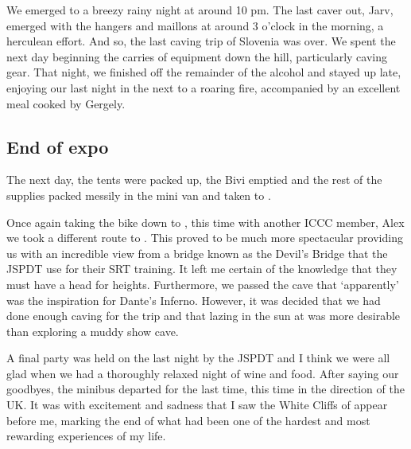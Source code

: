 
We emerged to
a breezy rainy night at around 10 pm. The last caver out, Jarv, emerged
with the hangers and maillons at around 3 o'clock in the morning, a
herculean effort. And so, the last caving trip of Slovenia was over. We
spent the next day beginning the carries of equipment down the hill,
particularly caving gear. That night, we finished off the remainder of
the alcohol and stayed up late, enjoying our last night in the  next
to a roaring fire, accompanied by an excellent meal cooked by Gergely.



\subsection{End of expo}

The next day, the tents were packed up, the Bivi emptied and the rest of
the supplies packed messily in the mini van and taken to .

Once again taking the bike down to , this time with another ICCC
member, Alex we took a different route to . This proved to be much
more spectacular providing us with an incredible view from a bridge
known as the Devil's Bridge that the JSPDT use for their SRT training.
It left me certain of the knowledge that they must have a head for
heights. Furthermore, we passed the cave that `apparently' was the
inspiration for Dante's Inferno. However, it was decided that we had
done enough caving for the trip and that lazing in the sun at  was
more desirable than exploring a muddy show cave.

A final party was held on the last night by the JSPDT and I think we
were all glad when we had a thoroughly relaxed night of wine and food.
After saying our goodbyes, the minibus departed  for the last
time, this time in the direction of the UK. It was with excitement and
sadness that I saw the White Cliffs of  appear before me, marking
the end of what had been one of the hardest and most rewarding
experiences of my life.


